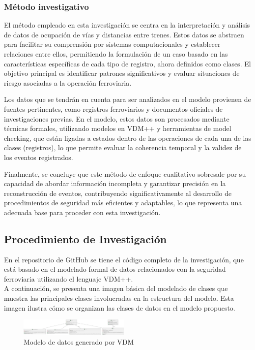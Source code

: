 \documentclass[journal]{IEEEtran}
\begin{document}
\subsubsection*{Método investigativo}  
El método empleado en esta investigación se centra en la interpretación y análisis de datos de ocupación de vías y distancias entre trenes. Estos datos se abstraen para facilitar su comprensión por sistemas computacionales y establecer relaciones entre ellos, permitiendo la formulación de un caso basado en las características específicas de cada tipo de registro, ahora definidos como clases. El objetivo principal es identificar patrones significativos y evaluar situaciones de riesgo asociadas a la operación ferroviaria.  

Los datos que se tendrán en cuenta para ser analizados en el modelo provienen de fuentes pertinentes, como registros ferroviarios y documentos oficiales de investigaciones previas. En el modelo, estos datos son procesados mediante técnicas formales, utilizando modelos en VDM++ y herramientas de model checking, que están ligadas a estados dentro de las operaciones de cada una de las clases (registros), lo que permite evaluar la coherencia temporal y la validez de los eventos registrados.  

Finalmente, se concluye que este método de enfoque cualitativo sobresale por su capacidad de abordar información incompleta y garantizar precisión en la reconstrucción de eventos, contribuyendo significativamente al desarrollo de procedimientos de seguridad más eficientes y adaptables, lo que representa una adecuada base para proceder con esta investigación.  

\subsection*{Procedimiento de Investigación}  
En el repositorio de GitHub se tiene el código completo de la investigación, que está basado en el modelado formal de datos relacionados con la seguridad ferroviaria utilizando el lenguaje VDM++.\cite{rodrigostranger2023trafico_de_trenes}\\
A continuación, se presenta una imagen básica del modelado de clases que muestra las principales clases involucradas en la estructura del modelo. Esta imagen ilustra cómo se organizan las clases de datos en el modelo propuesto.  

\begin{figure}[H]
    \centering
    \includegraphics[width=0.48\textwidth]{img/diagrama-clases.jpg}
    \caption{Modelo de datos generado por VDM}
    \label{fig:VDM_model}
\end{figure}
\end{document}
